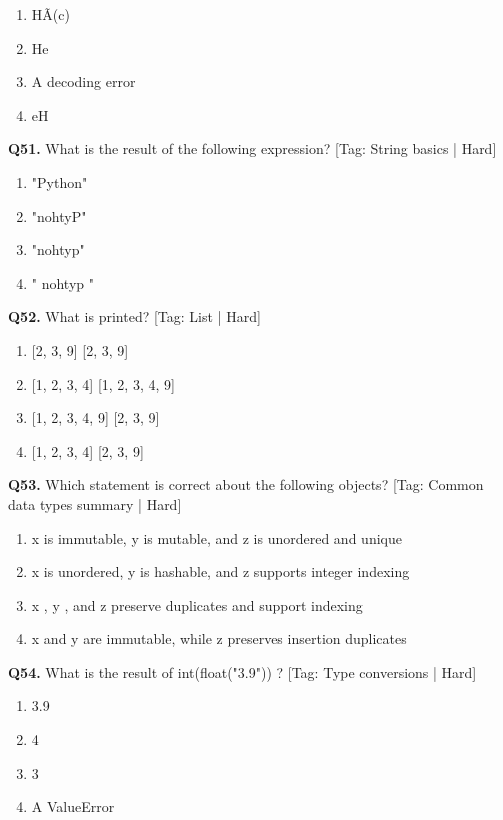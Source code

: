 \begin{enumerate}[label=(\alph*),topsep=2pt,itemsep=1pt,partopsep=0pt,parsep=0pt]
    \item {HÃ(c)}
    \item {He}
    \item {A decoding error}
    \item {eH}
\end{enumerate}
\vspace{2mm}
\noindent\textbf{Q51.} What is the result of the following expression? \hfill [Tag: String basics | Hard]
\begin{enumerate}[label=(\alph*),topsep=2pt,itemsep=1pt,partopsep=0pt,parsep=0pt]
    \item {"Python"}
    \item {"nohtyP"}
    \item {"nohtyp"}
    \item {" nohtyp "}
\end{enumerate}
\vspace{2mm}
\noindent\textbf{Q52.} What is printed? \hfill [Tag: List | Hard]
\begin{enumerate}[label=(\alph*),topsep=2pt,itemsep=1pt,partopsep=0pt,parsep=0pt]
    \item {[2, 3, 9] [2, 3, 9]}
    \item {[1, 2, 3, 4] [1, 2, 3, 4, 9]}
    \item {[1, 2, 3, 4, 9] [2, 3, 9]}
    \item {[1, 2, 3, 4] [2, 3, 9]}
\end{enumerate}
\vspace{2mm}
\noindent\textbf{Q53.} Which statement is correct about the following objects? \hfill [Tag: Common data types summary | Hard]
\begin{enumerate}[label=(\alph*),topsep=2pt,itemsep=1pt,partopsep=0pt,parsep=0pt]
    \item {x is immutable, y is mutable, and z is unordered and unique}
    \item {x is unordered, y is hashable, and z supports integer indexing}
    \item {x , y , and z preserve duplicates and support indexing}
    \item {x and y are immutable, while z preserves insertion duplicates}
\end{enumerate}
\vspace{2mm}
\noindent\textbf{Q54.} What is the result of int(float("3.9")) ? \hfill [Tag: Type conversions | Hard]
\begin{enumerate}[label=(\alph*),topsep=2pt,itemsep=1pt,partopsep=0pt,parsep=0pt]
    \item {3.9}
    \item {4}
    \item {3}
    \item {A ValueError}
\end{enumerate}
